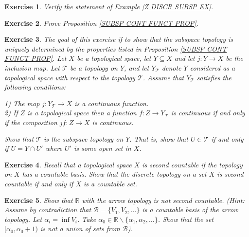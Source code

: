 \documentclass[11pt, letterpaper, oneside]{report}
\theoremstyle{pplain}
\newtheorem{ITERMVALUE THM}[theorem]{Intermediate Value Theorem}
\newtheorem{HEINEBOREL THM}[theorem]{Heine-Borel Theorem}
\newtheorem{UMETR THM}[theorem]{Urysohn Metrization Theorem}
\newtheorem{UMETR2 THM}[theorem]{Urysohn Metrization Theorem (v.2)}
\theoremstyle{ddefinition}
\theoremstyle{nnn}
\newtheorem{TDA NN}[theorem]{Topological Data Analysis. }
\theoremstyle{eexercise}
\newtheorem{exercise}{Exercise}[chapter]
\newcommand{\R}{{\mathbb R}}
\newcommand{\BB}{{\mathcal B}}
\newcommand{\TT}{{\mathcal T}}
\newcommand{\ssmin}{\smallsetminus}
\begin{document}
\begin{exercise}
Verify the statement of Example \ref{Z DISCR SUBSP EX}.
\end{exercise} 




\begin{exercise}
Prove Proposition \ref{SUBSP CONT FUNCT PROP}.
\end{exercise}




\begin{exercise}
The goal of this exercise if to show that the subspace topology is uniquely determined by the properties 
listed in  Proposition \ref{SUBSP CONT FUNCT PROP}. Let $X$ be a topological space, let 
$Y\subseteq X$ and let $j\colon Y \to X$ be the inclusion map. Let  $\TT$ be a topology on $Y$, 
and let $Y_{\TT}$ denote $Y$ considered as a topological space with respect to the topology $\TT$. 
Assume that $Y_{\TT}$  satisfies the following conditions:

1) The map $j\colon Y_{\TT} \to X$ is a continuous function. \\ 
2)  If $Z$ is a topological space then a function $f\colon Z\to Y_{\TT}$ is continuous if and only if 
the composition $jf\colon Z\to X$ is continuous. 

Show that $\TT$ is the subspace topology on $Y$. That is, show that $U\in \TT$ if and only if
$U = Y\cap U'$ where $U'$ is some open set in $X$. 

\end{exercise}




\begin{exercise}
\label{DISCR SECOND CONUNTABLE EXERCISE}
Recall that a topological space $X$ is second countable
if the topology on $X$ has a countable basis.  Show that the discrete topology on a set $X$
is second countable if and only if $X$ is a countable set. 
\end{exercise}




\begin{exercise}
\label{ARROW NOT 2 CONUNTABLE EXERCISE}
Show that $\R$ with the arrow topology is not second countable. 
(Hint: Assume by contradiction that $\BB= \{ V_{1}, V_{2}, \dots \}$ is a countable basis of the 
arrow topology. Let $\alpha_{i} = \inf V_{i}$.  Take $\alpha_{0}\in \R\ssmin \{\alpha_{1}, \alpha_{2}, \dots \}$. 
Show that the set $[\alpha_{0}, \alpha_{0} + 1)$ is not a union of sets from $\BB$).
\end{exercise}
\end{document}
